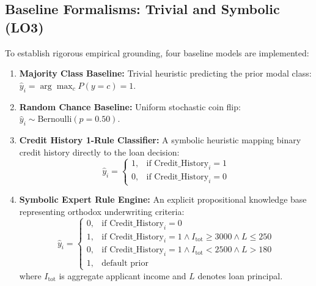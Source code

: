 \documentclass{COMPXXXX}
\begin{document}
\subsection{Baseline Formalisms: Trivial and Symbolic (LO3)}
To establish rigorous empirical grounding, four baseline models are implemented:
\begin{enumerate}
    \item \textbf{Majority Class Baseline:} Trivial heuristic predicting the prior modal class: $\hat{y}_i = \arg\max_{c} P(y=c) = 1$.
    \item \textbf{Random Chance Baseline:} Uniform stochastic coin flip: $\hat{y}_i \sim \text{Bernoulli}(p=0.50)$.
    \item \textbf{Credit History 1-Rule Classifier:} A symbolic heuristic mapping binary credit history directly to the loan decision:
    \begin{equation}
    \hat{y}_i = \begin{cases} 1, & \text{if } \text{Credit\_History}_i = 1 \\ 0, & \text{if } \text{Credit\_History}_i = 0 \end{cases}
    \end{equation}
    \item \textbf{Symbolic Expert Rule Engine:} An explicit propositional knowledge base representing orthodox underwriting criteria:
    \begin{equation}
    \hat{y}_i = \begin{cases} 
    0, & \text{if } \text{Credit\_History}_i = 0 \\
    1, & \text{if } \text{Credit\_History}_i = 1 \wedge I_{\text{tot}} \ge 3000 \wedge L \le 250 \\
    0, & \text{if } \text{Credit\_History}_i = 1 \wedge I_{\text{tot}} < 2500 \wedge L > 180 \\
    1, & \text{default prior}
    \end{cases}
    \end{equation}
    where $I_{\text{tot}}$ is aggregate applicant income and $L$ denotes loan principal.
\end{enumerate}
\end{document}
